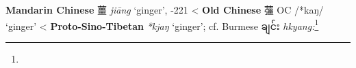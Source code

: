 \begin{etymology}\label{ety:jiang}
\textbf{Mandarin Chinese} {薑} \textit{jiāng} `ginger', -221
< \textbf{Old Chinese} {䕬} OC /*kaŋ/ `ginger'
< \textbf{Proto-Sino-Tibetan} \textit{*kjaŋ} `ginger'; cf. Burmese ချင်း \textit{hkyang:}\footnote{}
\end{etymology}